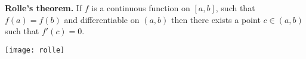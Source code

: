 \documentclass{article}
\begin{document}
\textbf{Rolle's theorem.} If $f$ is a continuous function on $[a,b]$, such that $f(a)=f(b)$ and differentiable on $(a,b)$ then there exists a point $c\in(a,b)$ such that $f'(c)=0$.


\texttt{[image: rolle]}
\end{document}
